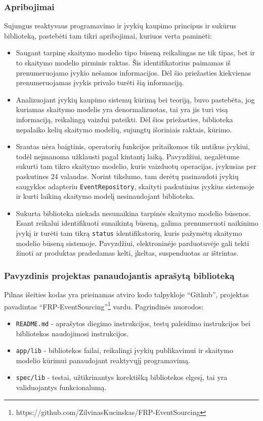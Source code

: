 \subsubsection{Apribojimai}

Sujungus reaktyvaus programavimo ir įvykių kaupimo principus ir sukūrus biblioteką, pastebėti tam tikri apribojimai, kuriuos verta paminėti:

\begin{itemize}
  \item Saugant tarpinę skaitymo modelio tipo būseną reikalingas ne tik tipas, bet ir to skaitymo modelio pirminis raktas. Šis identifikatorius paimamas iš prenumeruojamo įvykio nešamos informacijos. Dėl šio priežasties kiekvienas prenumeruojamas įvykis privalo turėti šią informaciją.
  \item Analizuojant įvykių kaupimo sistemų kūrimą bei teoriją, buvo pastebėta, jog kuriamas skaitymo modelis yra denormalizuotas, tai yra jis turi visą informaciją, reikalingą vaizdui pateikti. Dėl šios priežasties, biblioteka nepalaiko kelių skaitymo modelių, sujungtų išoriniais raktais, kūrimo.
  \item Srautas nėra baigtinis, operatorių funkcijos pritaikomos tik nutikus įvykiui, todėl neįmanoma užklausti pagal kintantį laiką. Pavyzdžiui, negalėtume sukurti tam tikro skaitymo modelio, kuris vaizduotų operacijas, įvykusias per paskutines 24 valandas. Norint tikslumo, tam derėtų pasinaudoti įvykių saugyklos adapteriu \lstinline|EventRepository|, skaityti paskutinius įvykius sistemoje ir kurti laikiną skaitymo modelį nesinaudojant biblioteka.
  \item Sukurta biblioteka niekada nesunaikina tarpinės skaitymo modelio būsenos. Esant reikalui identifikuoti sunaikintą būseną, galima prenumeruoti naikinimo įvykį ir turėti tam tikrą \lstinline|status| identifikatorių, kuris pažymėtų skaitymo modelio būseną sistemoje. Pavyzdžiui, elektroninėje parduotuvėje gali tekti žinoti ar produktas pradedamas kelti, įkeltas, suspenduotas ar ištrintas.
\end{itemize}

\subsubsection{Pavyzdinis projektas panaudojantis aprašytą biblioteką}

Pilnas išeities kodas yra prieinamas atviro kodo talpykloje ``Github'', projektas pavadintas ``FRP-EventSourcing''\footnote{https://github.com/ZilvinasKucinskas/FRP-EventSourcing} vardu. Pagrindinės nuorodos:

\begin{itemize}
  \item \lstinline|README.md| - aprašytos diegimo instrukcijos, testų paleidimo instrukcijos bei bibliotekos naudojimosi instrukcijos.
  \item \lstinline|app/lib| - bibliotekos failai, reikalingi įvykių publikavimui ir skaitymo modelio kūrimui panaudojant reaktyvųjį programavimą.
  \item \lstinline|spec/lib| - testai, užtikrinantys korektišką bibliotekos elgesį, tai yra validuojantys funkcionalumą.
\end{itemize}
